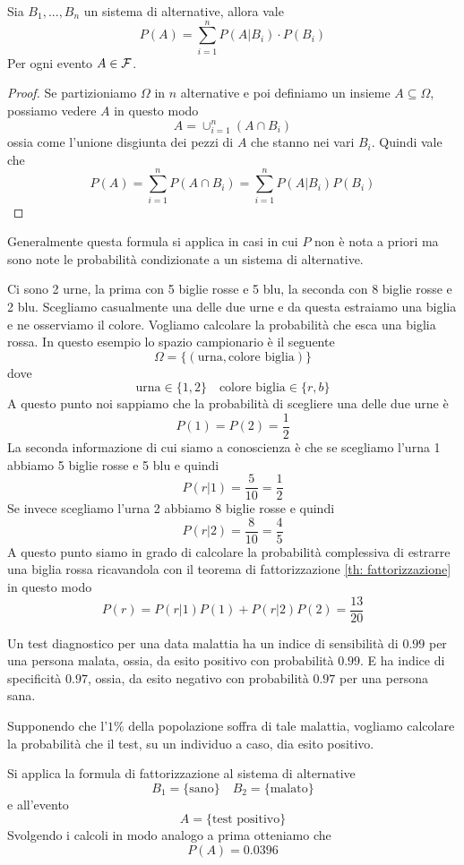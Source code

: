 \begin{theorem}[Fattorizzazione]\label{th: fattorizzazione}
	Sia $B_1, ..., B_n$ un sistema di alternative, allora vale 
	\[ P(A) = \sum_{i=1}^n P(A | B_i) \cdot P(B_i) \]
	Per ogni evento $A \in \mathcal{F}$.
	\begin{proof}
		Se partizioniamo $\Omega$ in $n$ alternative e poi definiamo un insieme
		$A \subseteq \Omega$, possiamo vedere $A$ in questo modo
		\[ A = \cup_{i=1}^n (A \cap B_i) \]
		ossia come l'unione disgiunta dei pezzi di $A$ che stanno nei vari $B_i$. Quindi vale che
		\[ P(A) = \sum_{i=1}^n P(A \cap B_i) = \sum_{i=1}^n P(A | B_i) P(B_i) \]
	\end{proof}
\end{theorem}

Generalmente questa formula si applica in casi in cui $P$ non è nota a priori ma sono note le
probabilità condizionate a un sistema di alternative.

\begin{example}
	Ci sono 2 urne, la prima con 5 biglie rosse e 5 blu, la seconda con 8 biglie rosse e 2 blu.
	Scegliamo casualmente una delle due urne e da questa estraiamo una biglia e ne osserviamo il
	colore. Vogliamo calcolare la probabilità che esca una biglia rossa. In questo esempio lo
	spazio campionario è il seguente 
	\[ \Omega = \{ (\text{urna}, \text{colore biglia}) \} \]
	dove 
	\[ \text{urna} \in \{ 1, 2 \} \quad \text{colore biglia} \in \{ r, b \} \]
	A questo punto noi sappiamo che la probabilità di scegliere una delle due urne è 
	\[ P(1) = P(2) = \frac{1}{2} \]
	La seconda informazione di cui siamo a conoscienza è che se scegliamo l'urna 1 abbiamo 5
	biglie rosse e 5 blu e quindi 
	\[ P(r | 1) = \frac{5}{10} = \frac{1}{2} \]
	Se invece scegliamo l'urna 2 abbiamo 8 biglie rosse e quindi 
	\[ P(r | 2) = \frac{8}{10} = \frac{4}{5} \]
	A questo punto siamo in grado di calcolare la probabilità complessiva di estrarre una biglia
	rossa ricavandola con il teorema di fattorizzazione \ref{th: fattorizzazione} in questo modo
	\[ P(r) = P(r | 1) P(1) + P(r | 2) P(2) = \frac{13}{20} \]
\end{example}

\begin{example}
	Un test diagnostico per una data malattia ha un indice di sensibilità di $0.99$ per una
	persona malata, ossia, da esito positivo con probabilità $0.99$. E ha indice di specificità
	$0.97$, ossia, da esito negativo con probabilità $0.97$ per una persona sana.

	Supponendo che l'$1\%$ della popolazione soffra di tale malattia, vogliamo calcolare la
	probabilità che il test, su un individuo a caso, dia esito positivo.

	Si applica la formula di fattorizzazione al sistema di alternative
	\[ B_1 = \{ \text{sano} \} \quad B_2 = \{ \text{malato} \} \]
	e all'evento 
	\[ A = \{ \text{test positivo} \} \]
	Svolgendo i calcoli in modo analogo a prima otteniamo che
	\[ P(A) = 0.0396 \]
\end{example}

